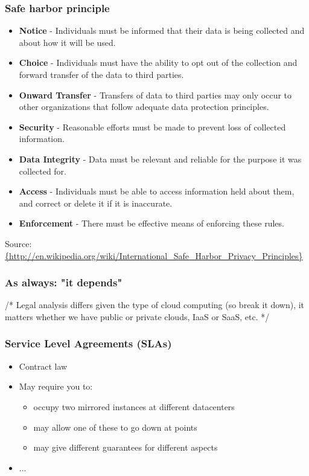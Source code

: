 \documentclass{beamer}
\begin{document}
\begin{frame}
    \frametitle{Safe harbor principle}
    \begin{scriptsize}
    \begin{itemize}
        \item \textbf{Notice} - Individuals must be informed that their data is being collected and about how it will be used.
        \item \textbf{Choice} - Individuals must have the ability to opt out of the collection and forward transfer of the data to third parties.
        \item \textbf{Onward Transfer} - Transfers of data to third parties may only occur to other organizations that follow adequate data protection principles.
        \item \textbf{Security} - Reasonable efforts must be made to prevent loss of collected information.
        \item \textbf{Data Integrity} - Data must be relevant and reliable for the purpose it was collected for.
        \item \textbf{Access} - Individuals must be able to access information held about them, and correct or delete it if it is inaccurate.
        \item \textbf{Enforcement} - There must be effective means of enforcing these rules.
    \end{itemize}
    \end{scriptsize}
    \footnotesize{Source: \url{{http://en.wikipedia.org/wiki/International_Safe_Harbor_Privacy_Principles}}}
\end{frame}

\begin{frame}
    \frametitle{As always: "it depends"}
    /* Legal analysis differs given the type of cloud computing (so break it
    down), it matters whether we have public or private clouds, IaaS or SaaS,
    etc. */
\end{frame}

\begin{frame}
    \frametitle{Service Level Agreements (SLAs)}
    \begin{itemize}
    \item Contract law
    \item May require you to:
      \begin{itemize} %
        \item occupy two mirrored instances at different datacenters
        \item may allow one of these to go down at points
        \item may give different guarantees for different aspects
      \end{itemize}
    \item ...
    \end{itemize}
\end{frame}
\end{document}
